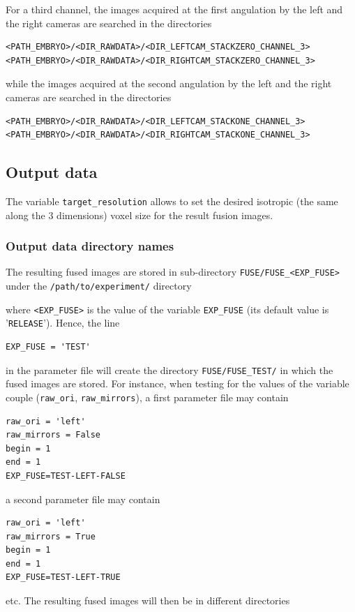 For a third channel, 
the images acquired at the first angulation by the
left and the right cameras are searched in the directories
\begin{verbatim}
<PATH_EMBRYO>/<DIR_RAWDATA>/<DIR_LEFTCAM_STACKZERO_CHANNEL_3>
<PATH_EMBRYO>/<DIR_RAWDATA>/<DIR_RIGHTCAM_STACKZERO_CHANNEL_3>
\end{verbatim}
while the images acquired at the second angulation by the
left and the right cameras are searched in the directories
\begin{verbatim}
<PATH_EMBRYO>/<DIR_RAWDATA>/<DIR_LEFTCAM_STACKONE_CHANNEL_3>
<PATH_EMBRYO>/<DIR_RAWDATA>/<DIR_RIGHTCAM_STACKONE_CHANNEL_3>
\end{verbatim}



\subsection{Output data}
\label{sec:cli:fuse:output:data}

The variable \texttt{target\_resolution} allows to set the desired isotropic (the
same along the 3 dimensions) voxel size for the result fusion
images.

\subsubsection{Output data directory names}

The resulting fused images are stored in sub-directory
\texttt{FUSE/FUSE\_<EXP\_FUSE>} under the
\texttt{/path/to/experiment/} directory 

\mbox{}
\mbox{}

where \texttt{<EXP\_FUSE>} is the value of the variable \texttt{EXP\_FUSE} (its
default value is '\texttt{RELEASE}'). Hence, the line
\begin{verbatim}
EXP_FUSE = 'TEST'
\end{verbatim}
in the parameter file will create the directory
\texttt{FUSE/FUSE\_TEST/} in which the fused images are stored. For
instance, when testing for the values of the variable couple
(\texttt{raw\_ori}, \texttt{raw\_mirrors}), a first parameter file may
contain
\begin{verbatim}
raw_ori = 'left'
raw_mirrors = False
begin = 1
end = 1
EXP_FUSE=TEST-LEFT-FALSE
\end{verbatim}
a second parameter file may
contain
\begin{verbatim}
raw_ori = 'left'
raw_mirrors = True
begin = 1
end = 1
EXP_FUSE=TEST-LEFT-TRUE
\end{verbatim}
etc. The resulting fused images will then be in different directories


